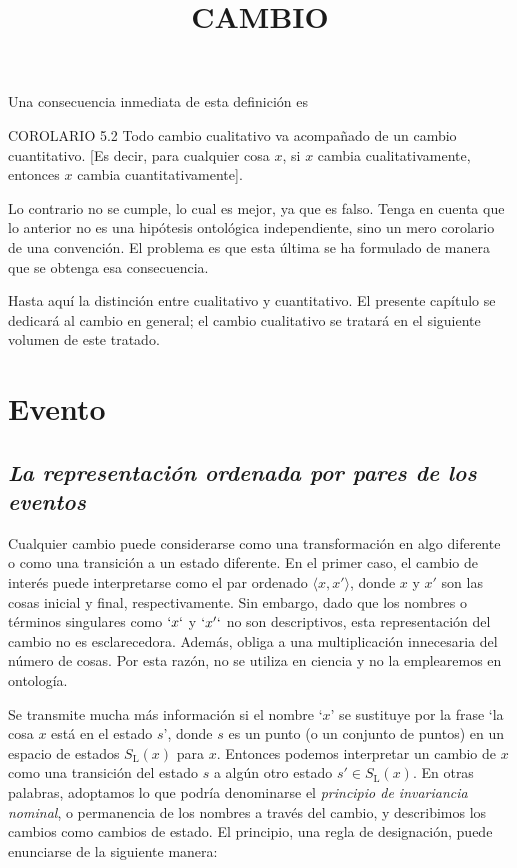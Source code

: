 \begin{justifying}
	Una consecuencia inmediata de esta definición es

	\bigskip

	COROLARIO 5.2 Todo cambio cualitativo va acompañado de un cambio cuantitativo.
	[Es decir, para cualquier cosa $x$, si $x$ cambia cualitativamente, entonces $x$ cambia cuantitativamente].

	Lo contrario no se cumple, lo cual es mejor, ya que es falso.
	Tenga en cuenta que lo anterior no es una hipótesis ontológica independiente, sino un
	mero corolario de una convención. El problema es que esta última se ha
	formulado de manera que se obtenga esa consecuencia.

	Hasta aquí la distinción entre cualitativo y cuantitativo. El presente
	capítulo se dedicará al cambio en general; el cambio cualitativo se tratará
	en el siguiente volumen de este tratado.

	\newpage

	\begin{center}
		\title{\normalsize CAMBIO}
	\end{center}

	\section{\centering Evento}

	\subsection{\normalsize \textit{La representación ordenada por pares de los eventos}}
	\noindent Cualquier cambio puede considerarse como una transformación en algo diferente
	o como una transición a un estado diferente. En el primer caso, el cambio de
	interés puede interpretarse como el par ordenado $\langle x, x' \rangle$, donde $x$ y $x'$
	son las cosas inicial y final, respectivamente. Sin embargo, dado que los nombres o
	términos singulares como $`x`$ y $`x'`$ no son descriptivos, esta representación
	del cambio no es esclarecedora. Además, obliga a una multiplicación innecesaria
	del número de cosas. Por esta razón, no se utiliza en ciencia
	y no la emplearemos en ontología.

	Se transmite mucha más información si el nombre `$x$' se sustituye por la
	frase `la cosa $x$ está en el estado $s$', donde $s$ es un punto (o un conjunto de puntos) en un
	espacio de estados $S_\mathrm{L}(x)$ para $x$. Entonces podemos interpretar un cambio de $x$ como una transición
	del estado $s$ a algún otro estado $s' \in S_\mathrm{L}(x)$. En otras palabras, adoptamos lo que
	podría denominarse el \textit{principio de invariancia nominal}, o permanencia de los
	nombres a través del cambio, y describimos los cambios como cambios de estado. El
	principio, una regla de designación, puede enunciarse de la siguiente manera:


\end{justifying}
